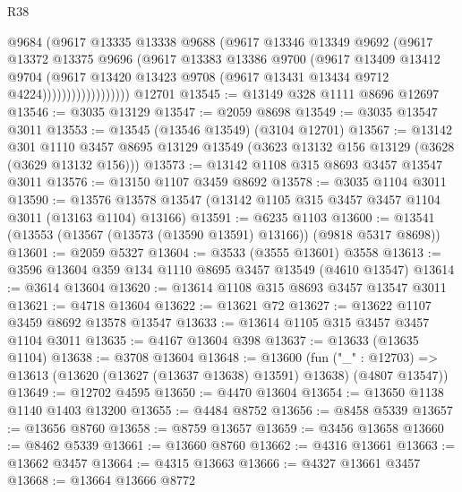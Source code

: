 \begin{lexlean}{R38}
\begin{coremodule}
                          @9684
                          (@9617
                            @13335
                            @13338
                            @9688
                            (@9617
                              @13346
                              @13349
                              @9692
                              (@9617
                                @13372
                                @13375
                                @9696
                                (@9617
                                  @13383
                                  @13386
                                  @9700
                                  (@9617
                                    @13409
                                    @13412
                                    @9704
                                    (@9617
                                      @13420
                                      @13423
                                      @9708
                                      (@9617 @13431 @13434 @9712 @4224))))))))))))))))))
    @12701
@13545 := @13149 @328 @1111 @8696 @12697
@13546 := @3035 @13129
@13547 := @2059 @8698
@13549 := @3035 @13547 @3011
@13553 := @13545 (@13546 @13549) (@3104 @12701)
@13567 := @13142
    @301
    @1110
    @3457
    @8695
    @13129
    @13549
    (@3623 @13132 @156 @13129 (@3628 (@3629 @13132 @156)))
@13573 := @13142 @1108 @315 @8693 @3457 @13547 @3011
@13576 := @13150 @1107 @3459 @8692
@13578 := @3035 @1104 @3011
@13590 := @13576 @13578 @13547 (@13142 @1105 @315 @3457 @3457 @1104 @3011 (@13163 @1104) @13166)
@13591 := @6235 @1103
@13600 := @13541 (@13553 (@13567 (@13573 (@13590 @13591) @13166)) (@9818 @5317 @8698))
@13601 := @2059 @5327
@13604 := @3533 (@3555 @13601) @3558
@13613 := @3596 @13604 @359 @134 @1110 @8695 @3457 @13549 (@4610 @13547)
@13614 := @3614 @13604
@13620 := @13614 @1108 @315 @8693 @3457 @13547 @3011
@13621 := @4718 @13604
@13622 := @13621 @72
@13627 := @13622 @1107 @3459 @8692 @13578 @13547
@13633 := @13614 @1105 @315 @3457 @3457 @1104 @3011
@13635 := @4167 @13604 @398
@13637 := @13633 (@13635 @1104)
@13638 := @3708 @13604
@13648 := @13600
    (fun ("_" : @12703) => @13613 (@13620 (@13627 (@13637 @13638) @13591) @13638) (@4807 @13547))
@13649 := @12702 @4595
@13650 := @4470 @13604
@13654 := @13650 @1138 @1140 @1403 @13200
@13655 := @4484 @8752
@13656 := @8458 @5339
@13657 := @13656 @8760
@13658 := @8759 @13657
@13659 := @3456 @13658
@13660 := @8462 @5339
@13661 := @13660 @8760
@13662 := @4316 @13661
@13663 := @13662 @3457
@13664 := @4315 @13663
@13666 := @4327 @13661 @3457
@13668 := @13664 @13666 @8772

\end{coremodule}
\end{lexlean}
